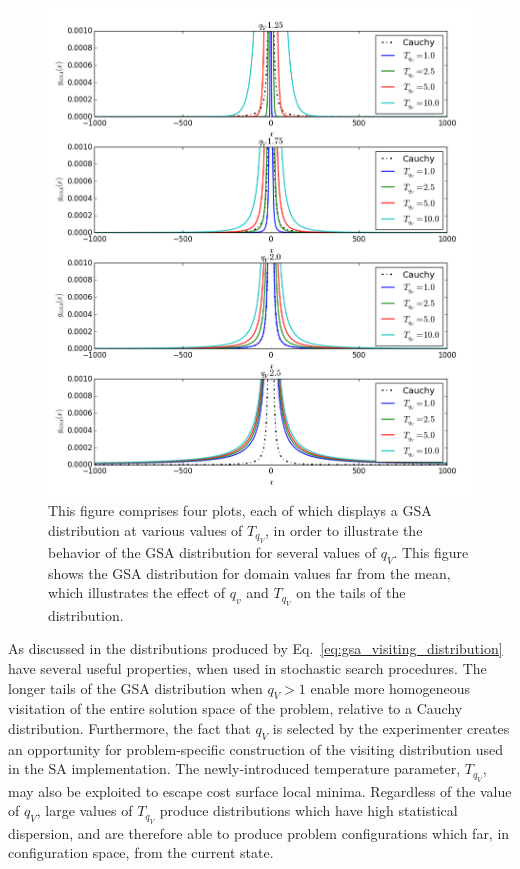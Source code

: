 \documentclass[11pt]{afthesis}
\begin{document}
	\begin{figure}[ht!]
		
		\centerline{\includegraphics[width = 5in]{figures/gsa_distribution_wing_detail.png}}
		\caption{This figure comprises four plots, each of which displays a GSA distribution at various values of $T_{q_V}$, in order to illustrate the behavior of the GSA distribution for several values of $q_V$. This figure shows the GSA distribution for domain values far from the mean, which illustrates the effect of $q_v$ and $T_{q_V}$ on the tails of the distribution.}
		\label{fig:gsa_distribution_wing_detail}
	\end{figure}
	
	As discussed in \cite{dallinga2004performancegsa,andricioaei1996applicationgsatetrapide} the distributions produced by Eq.~\ref{eq:gsa_visiting_distribution} have several useful properties, when used in stochastic search procedures. The longer tails of the GSA distribution when $q_V>1$ enable more homogeneous visitation of the entire solution space of the problem, relative to a Cauchy distribution. Furthermore, the fact that $q_V$ is selected by the experimenter creates an opportunity for problem-specific construction of the visiting distribution used in the SA implementation. The newly-introduced temperature parameter, $T_{q_V}$, may also be exploited to escape cost surface local minima. Regardless of the value of $q_V$, large values of $T_{q_V}$ produce distributions which have high statistical dispersion, and are therefore able to produce problem configurations which far, in configuration space, from the current state. 
\end{document}
